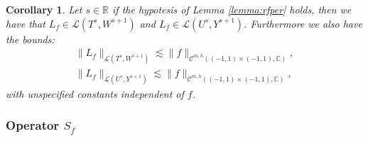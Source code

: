 \documentclass{article}
\newtheorem{corollary}[theorem]{Corollary}
\newenvironment{proof}{\paragraph{Proof:}}{\hfill$\square$}
\newcommand{\IC}{{\mathbb C}}
\newcommand{\IR}{{\mathbb R}}
\newcommand{\cmspaceh}[4]{\mathcal{C}^{#1,#2} \left( #3, #4 \right)}
\newcommand{\iinterv}{(-1,1)\times(-1,1)}
\begin{document}
\begin{corollary}
\label{corollary:lfop}
Let $s \in \IR$ if the hypotesis of Lemma \ref{lemma:rfper} holds, then
 we have that $ L_f  \in \mathcal{L}(T^{s},W^{s+1})$ and  $L_f  \in \mathcal{L}(U^{s},Y^{s+1})$. Furthermore we also have the bounds: 
\begin{align*}
\| L_f\|_{ \mathcal{L}(T^{s},W^{s+1})} \lesssim \|f\|_{\cmspaceh{m}{h}{\iinterv}{\IC}},\\
\| L_f\|_{ \mathcal{L}(U^{s},Y^{s+1})} \lesssim \|f\|_{\cmspaceh{m}{h}{\iinterv}{\IC}},
\end{align*}
with unspecified constants independent of $f$.
\end{corollary}

\subsubsection{Operator $S_f$}
\end{document}
